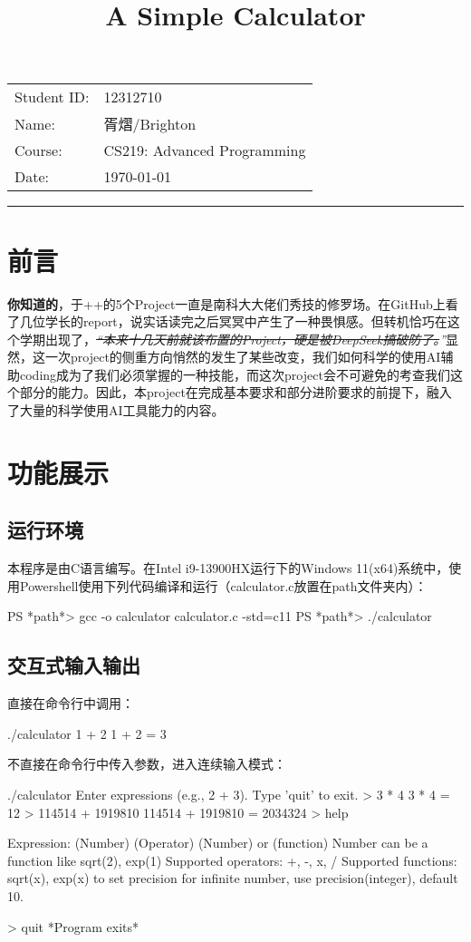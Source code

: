 \documentclass[11pt]{article}
\title{\textbf{A Simple Calculator}}
\author{} %
\date{}   %
\makeatletter
\renewcommand{\maketitle}{
  \begin{center}
    {\LARGE \@title \par} %
    \vspace{1em}
    \textbf{\@author}     %
    \vspace{1em}
    \begin{tabular}{ll}
      Student ID: & 12312710 \\
      Name:       & 胥熠/Brighton \\
      Course:     & CS219: Advanced Programming \\
      Date:       & \today
    \end{tabular}
    \vspace{0.5em}
    \hrule height 0.8pt %
  \end{center}
}
\makeatother
\begin{document}
\thispagestyle{empty}
\maketitle

{
\tableofcontents
}
\vspace{2em}
\section{前言}
\textbf{你知道的}，于++的5个Project一直是南科大大佬们秀技的修罗场。在GitHub上看了几位学长的report，说实话读完之后冥冥中产生了一种畏惧感。但转机恰巧在这个学期出现了，\textit{\sout{“本来十几天前就该布置的Project，硬是被DeepSeek搞破防了。}”}显然，这一次project的侧重方向悄然的发生了某些改变，我们如何科学的使用AI辅助coding成为了我们必须掌握的一种技能，而这次project会不可避免的考查我们这个部分的能力。因此，本project在完成基本要求和部分进阶要求的前提下，融入了大量的科学使用AI工具能力的内容。

\section{功能展示}
\subsection{运行环境}
本程序是由C语言编写。在Intel i9-13900HX运行下的Windows 11(x64)系统中，使用Powershell使用下列代码编译和运行（calculator.c放置在path文件夹内）：
\begin{commandline}
PS *path*> gcc -o calculator calculator.c -std=c11
PS *path*> ./calculator
\end{commandline}

\subsection{交互式输入输出}
直接在命令行中调用：
\begin{commandline}
./calculator 1 + 2
1 + 2 = 3
\end{commandline}
不直接在命令行中传入参数，进入连续输入模式：
\begin{commandline}
./calculator      
Enter expressions (e.g., 2 + 3). Type 'quit' to exit.
> 3 * 4
3 * 4 = 12
> 114514 + 1919810
114514 + 1919810 = 2034324
> help

Expression: (Number) (Operator) (Number) or (function)
Number can be a function like sqrt(2), exp(1)
Supported operators: +, -, x, /
Supported functions: sqrt(x), exp(x)
to set precision for infinite number, use precision(integer), default 10.

> quit
*Program exits*
\end{commandline}
\end{document}
